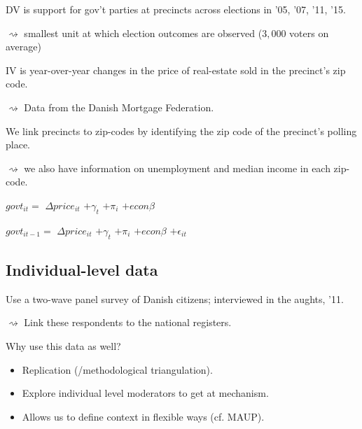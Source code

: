 \documentclass[10pt,aspectratio=169,handout]{beamer}
\begin{document}
\begin{frame}
DV is support for gov't parties at precincts across elections in '05, '07, '11, '15.

$\rightsquigarrow$  smallest unit at which election outcomes are observed ($3,000$ voters on average)

\vspace{0.2in} \pause
IV is year-over-year changes in the price of real-estate sold in the precinct's zip code.

$\rightsquigarrow$ Data from the Danish Mortgage Federation. \pause

\vspace{0.2in}

We link precincts to zip-codes by identifying the zip code of the precinct's polling place.

$\rightsquigarrow$  we also have information on unemployment and median income in each zip-code.



\end{frame}

\begin{frame} 
\begin{center}	
\huge{ \noindent $govt_{it}=$  $\Delta price_{it} $ \only<1>{$+ \epsilon_{it}$} \pause $+ \gamma_t$  \pause $+ \pi_i$  \pause  $+ econ \beta$  \pause

\vspace{0.2in}
\noindent $govt_{it-1}=$  $\Delta price_{it} $ $+ \gamma_t$ $+ \pi_i$  $+ econ \beta$ $+ \epsilon_{it}$
}
\end{center}
\end{frame}







\subsection{Individual-level data}

\begin{frame}
Use a two-wave panel survey of Danish citizens; interviewed in the aughts, '11. \pause


$\rightsquigarrow$ Link these respondents to the national registers.

\vspace{0.1in} \pause

Why use this data as well?
\begin{itemize} \pause
\item Replication (/methodological triangulation). \pause
\item Explore individual level moderators to get at mechanism. \pause
\item Allows us to define context in flexible ways (cf. MAUP).
\end{itemize}
\end{frame}
\end{document}
